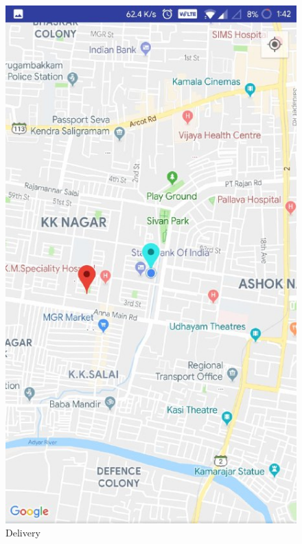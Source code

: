 \begin{figure}[h]
  \begin{center}
\includegraphics[scale=0.6]{3/eleven.jpeg}
\caption{Delivery}
\label{fig:two}
\end{center}
\end{figure}

